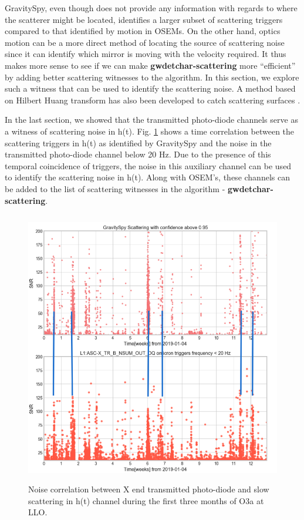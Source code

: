 \documentclass[12pt]{iopart}
\begin{document}
GravitySpy, even though does not provide any information with regards to where the scatterer might be located, identifies a larger subset of scattering triggers compared to that identified by motion in OSEMs. On the other hand, optics motion can be a more direct method of locating the source of scattering noise since it can identify which mirror is moving with the velocity required. It thus makes more sense to see if we can make \textbf{gwdetchar-scattering} more ``efficient'' by adding better scattering witnesses to the algorithm. In this section, we explore such a witness that can be used to identify the scattering noise. A method based on Hilbert Huang transform has also been developed to catch scattering surfaces \cite{hhtransform}.

In the last section, we showed that the transmitted photo-diode channels serve as a witness of scattering noise in h(t). Fig. \ref{fig:transetmx} shows a time correlation between the scattering triggers in h(t) as identified by GravitySpy and the noise in the transmitted photo-diode channel below 20 Hz. Due to the presence of this temporal coincidence of triggers, the noise in this auxiliary channel can be used to identify the scattering noise in h(t). Along with OSEM’s, these channels can be added to the list of scattering witnesses in the algorithm - \textbf{gwdetchar-scattering}.

\begin{figure}[h]
  \centering
         \includegraphics[width = 14cm,height=12cm]{htxtrb_corr2.png}
         \caption{Noise correlation between X end transmitted photo-diode and slow scattering in h(t) channel during the first three months of O3a at LLO. }
    \label{fig:transetmx}
\end{figure}
\end{document}
